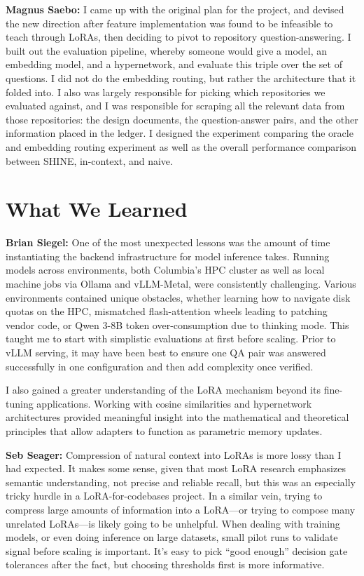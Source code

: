 \documentclass[conference,10.5pt]{IEEEtran}
\begin{document}
\textbf{Magnus Saebo:} I came up with the original plan for the project, and devised the new direction after feature implementation was found to be infeasible to teach through LoRAs, then deciding to pivot to repository question-answering. I built out the evaluation pipeline, whereby someone would give a model, an embedding model, and a hypernetwork, and evaluate this triple over the set of questions. I did not do the embedding routing, but rather the architecture that it folded into. I also was largely responsible for picking which repositories we evaluated against, and I was responsible for scraping all the relevant data from those repositories: the design documents, the question-answer pairs, and the other information placed in the ledger. I designed the experiment comparing the oracle and embedding routing experiment as well as the overall performance comparison between SHINE, in-context, and naive.
 
 
\section{What We Learned}
 
\textbf{Brian Siegel:} One of the most unexpected lessons was the amount of time instantiating the backend infrastructure for model inference takes. Running models across environments, both Columbia's HPC cluster as well as local machine jobs via Ollama and vLLM-Metal, were consistently challenging. Various environments contained unique obstacles, whether learning how to navigate disk quotas on the HPC, mismatched flash-attention wheels leading to patching vendor code, or Qwen 3-8B token over-consumption due to thinking mode. This taught me to start with simplistic evaluations at first before scaling. Prior to vLLM serving, it may have been best to ensure one QA pair was answered successfully in one configuration and then add complexity once verified.

I also gained a greater understanding of the LoRA mechanism beyond its fine-tuning applications. Working with cosine similarities and hypernetwork architectures provided meaningful insight into the mathematical and theoretical principles that allow adapters to function as parametric memory updates. 


 
\textbf{Seb Seager:} Compression of natural context into LoRAs is more lossy than I had expected. It makes some sense, given that most LoRA research emphasizes semantic understanding, not precise and reliable recall, but this was an especially tricky hurdle in a LoRA-for-codebases project. In a similar vein, trying to compress large amounts of information into a LoRA---or trying to compose many unrelated LoRAs---is likely going to be unhelpful. When dealing with training models, or even doing inference on large datasets, small pilot runs to validate signal before scaling is important. It's easy to pick ``good enough'' decision gate tolerances after the fact, but choosing thresholds first is more informative.
 
\end{document}
